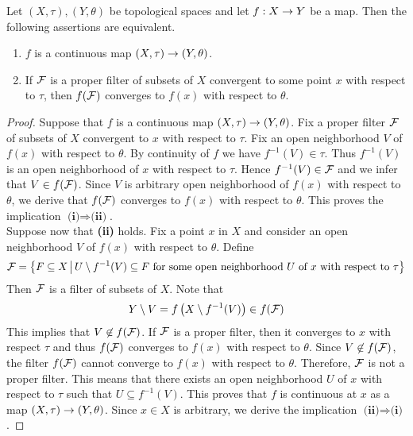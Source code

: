 \begin{proposition}\label{proposition:characterization_of_continuous_maps_in_terms_of_filters}
Let $(X,\tau),(Y,\theta)$ be topological spaces and let $f:X\rightarrow Y$ be a map. Then the following assertions are equivalent.
\begin{enumerate}[label=\emph{\textbf{(\roman*)}}, leftmargin=*]
\item $f$ is a continuous map $\left(X,\tau\right)\rightarrow \left(Y,\theta\right)$.
\item If ${\mathcal F}$ is a proper filter of subsets of $X$ convergent to some point $x$ with respect to $\tau$, then $f({\mathcal F})$ converges to $f(x)$ with respect to $\theta$.
\end{enumerate}
\end{proposition}
\begin{proof}
Suppose that $f$ is a continuous map $\left(X,\tau\right)\rightarrow \left(Y,\theta\right)$. Fix a proper filter ${\mathcal F}$ of subsets of $X$ convergent to $x$ with respect to $\tau$. Fix an open neighborhood $V$ of $f(x)$ with respect to $\theta$. By continuity of $f$ we have $f^{-1}(V) \in \tau$. Thus $f^{-1}(V)$ is an open neighborhood of $x$ with respect to $\tau$. Hence $f^{-1}(V) \in {\mathcal F}$ and we infer that $V \in f({\mathcal F})$. Since $V$ is arbitrary open neighborhood of $f(x)$ with respect to $\theta$, we derive that $f({\mathcal F})$ converges to $f(x)$ with respect to $\theta$. This proves the implication $\textbf{(i)}\Rightarrow \textbf{(ii)}$.\\
Suppose now that \textbf{(ii)} holds. Fix a point $x$ in $X$ and consider an open neighborhood $V$ of $f(x)$ with respect to $\theta$. Define
$${\mathcal F} = \big\{F\subseteq X\,\big|\,U\setminus f^{-1}(V)\subseteq F\mbox{ for some open neighborhood }U\mbox{ of }x\mbox{ with respect to }\tau\big\}$$
Then ${\mathcal F}$ is a filter of subsets of $X$. Note that
$$Y\setminus V = f\left(X\setminus f^{-1}(V)\right) \in f({\mathcal F})$$
This implies that $V \not \in f({\mathcal F})$. If ${\mathcal F}$ is a proper filter, then it converges to $x$ with respect $\tau$ and thus $f({\mathcal F})$ converges to $f(x)$ with respect to $\theta$. Since $V \not \in f({\mathcal F})$, the filter $f({\mathcal F})$ cannot converge to $f(x)$ with respect to $\theta$. Therefore, ${\mathcal F}$ is not a proper filter. This means that there exists an open neighborhood $U$ of $x$ with respect to $\tau$ such that $U \subseteq f^{-1}(V)$. This proves that $f$ is continuous at $x$ as a map $\left(X,\tau\right)\rightarrow \left(Y,\theta\right)$. Since $x\in X$ is arbitrary, we derive the implication $\textbf{(ii)}\Rightarrow \textbf{(i)}$.
\end{proof}

